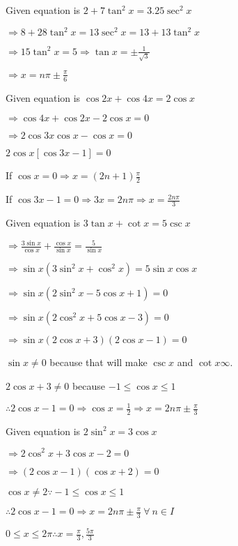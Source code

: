 \item Given equation is $2 + 7\tan^2x = 3.25\sec^2x$

  $\Rightarrow 8 + 28\tan^2x = 13\sec^2x = 13 + 13\tan^2x$

  $\Rightarrow 15\tan^2x = 5 \Rightarrow \tan x = \pm \frac{1}{\sqrt{3}}$

  $\Rightarrow x = n\pi \pm \frac{\pi}{6}$

\item Given equation is $\cos 2x + \cos 4x = 2\cos x$

  $\Rightarrow \cos4x + \cos2x - 2\cos x = 0$

  $\Rightarrow 2\cos3x\cos x - \cos x = 0$

  $2\cos x[\cos 3x - 1] = 0$

  If $\cos x = 0 \Rightarrow x = (2n + 1)\frac{\pi}{2}$

  If $\cos 3x - 1 = 0\Rightarrow 3x = 2n\pi \Rightarrow x = \frac{2n\pi}{3}$

\item Given equation is $3\tan x + \cot x = 5\csc x$

  $\Rightarrow \frac{3\sin x}{\cos x} + \frac{\cos x}{\sin x} = \frac{5}{\sin x}$

  $\Rightarrow \sin x(3\sin^2x + \cos^2x) = 5\sin x\cos x$

  $\Rightarrow \sin x(2\sin^2x - 5\cos x + 1) = 0$

  $\Rightarrow \sin x(2\cos^2x + 5\cos x - 3) = 0$

  $\Rightarrow \sin x(2\cos x + 3)(2\cos x - 1) = 0$

  $\sin x\neq 0$ because that will make $\csc x$ and $\cot x \infty.$

  $2\cos x + 3 \neq 0$ because $-1\leq \cos x\leq 1$

  $\therefore 2\cos x - 1 = 0\Rightarrow \cos x = \frac{1}{2} \Rightarrow x = 2n\pi \pm \frac{\pi}{3}$

\item Given equation is $2\sin^2x = 3\cos x$

  $\Rightarrow 2\cos^2x + 3\cos x - 2 = 0$

  $\Rightarrow (2\cos x - 1)(\cos x + 2) = 0$

  $\cos x \neq 2 \because -1\leq \cos x\leq 1$

  $\therefore 2\cos x - 1 = 0\Rightarrow x = 2n\pi \pm \frac{\pi}{3}~\forall~n\in I$

  $0\leq x \leq 2\pi \therefore x = \frac{\pi}{3}, \frac{5\pi}{3}$

